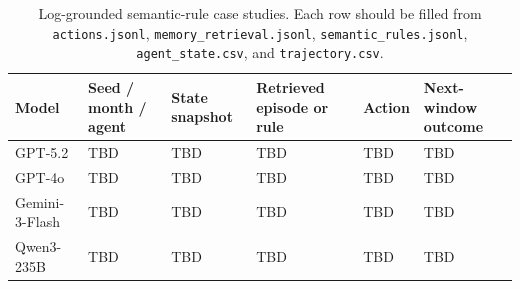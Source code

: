 \ifdefined\FinEvoAllowHistoricalPrePZeroEvidence\else
{}
\fi

\begin{table}[t]
\centering
\small
\setlength{\tabcolsep}{3pt}
\begin{tabular}{p{}p{}p{}p{}p{}p{}}
\toprule
Model & Seed / month / agent & State snapshot & Retrieved episode or rule & Action & Next-window outcome \\
\midrule
GPT-5.2 & TBD & TBD & TBD & TBD & TBD \\
GPT-4o & TBD & TBD & TBD & TBD & TBD \\
Gemini-3-Flash & TBD & TBD & TBD & TBD & TBD \\
Qwen3-235B & TBD & TBD & TBD & TBD & TBD \\
\bottomrule
\end{tabular}
\caption{Log-grounded semantic-rule case studies.  Each row should be filled
from \texttt{actions.jsonl}, \texttt{memory\_retrieval.jsonl},
\texttt{semantic\_rules.jsonl}, \texttt{agent\_state.csv}, and
\texttt{trajectory.csv}.}
\label{tab:semantic_rule_case_study}
\end{table}
